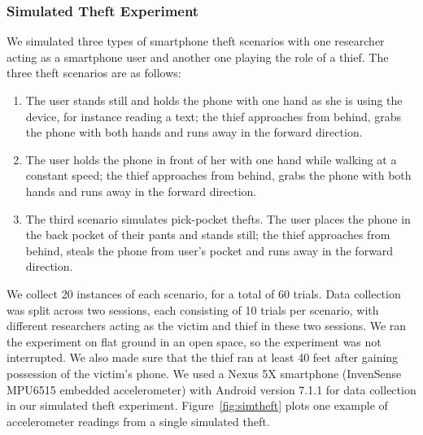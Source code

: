 \subsubsection{Simulated Theft Experiment}
We simulated three types of smartphone theft scenarios with one researcher acting as a smartphone user and another one playing the role of a thief. 
The three theft scenarios are as follows:
\begin{enumerate}
\item The user stands still and holds the phone with one hand as she is using the device, for instance reading a text; the thief approaches from behind, grabs the phone with both hands and runs away in the forward direction. 
\item The user holds the phone in front of her with one hand while walking at a constant speed; the thief approaches from behind, grabs the phone with both hands and runs away in the forward direction. 
\item The third scenario simulates pick-pocket thefts. The user places the phone in the back pocket of their pants and stands still; the thief approaches from behind, steals the phone from user's pocket and runs away in the forward direction.
\end{enumerate}
We collect 20 instances of each scenario, for a total of 60 trials. 
Data collection was split across two sessions, each consisting of 10 trials per scenario, with different researchers acting as the victim and thief in these two sessions. 
We ran the experiment on flat ground in an open space, so the experiment was not interrupted. 
We also made sure that the thief ran at least 40 feet after gaining possession of the victim's phone.
We used a Nexus 5X smartphone (InvenSense MPU6515 embedded accelerometer) with Android version 7.1.1 for data collection in our simulated theft experiment.
Figure~\ref{fig:simtheft} plots one example of accelerometer readings from a single simulated theft.


